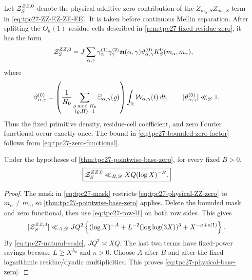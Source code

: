 Let \(\mathcal Z_S^{ZZ,0}\) denote the physical additive-zero contribution of
the \(Z_{m_\alpha,S}Z_{m_\gamma,S}\) term in
\eqref{eq:tpc27-ZZ-EZ-ZE-EE}.  It is taken before continuous Mellin
separation.  After splitting the \(O_h(1)\) residue cells described in
\cref{rem:tpc27-fixed-residue-zero}, it has the form
\begin{align}
 \mathcal Z_S^{ZZ,0}
 ={}&J\sum_{\alpha,\gamma}
 \gamma_\alpha^{(1)}\gamma_\gamma^{(2)}
 \mathfrak m(\alpha,\gamma)
 \vartheta_{\alpha,\gamma}^{(0)}
 K_S^0(m_\alpha,m_\gamma),
 \label{eq:tpc27-physical-ZZ-zero}
\end{align}
where
\begin{equation}
 \vartheta_{\alpha,\gamma}^{(0)}
 =\left(
 \frac1{H_0}
 \sum_{\substack{\varrho\bmod H_0\\(\varrho,H)=1}}
 \Xi_{\alpha,\gamma}(\varrho)
 \right)
 \int_{\mathbb R}\mathcal W_{\alpha,\gamma}(t)\,dt,
 \qquad
 |\vartheta_{\alpha,\gamma}^{(0)}|\ll_{\mathscr D}1.
 \label{eq:tpc27-bounded-zero-factor}
\end{equation}
Thus the fixed primitive density, residue-cell coefficient, and zero
Fourier functional occur exactly once.  The bound in
\eqref{eq:tpc27-bounded-zero-factor} follows from
\eqref{eq:tpc27-zero-functional}.

\begin{theorem}
\label{thm:tpc27-physical-base-zero}
Under the hypotheses of
\cref{thm:tpc27-pointwise-base-zero}, for every fixed \(B>0\),
\begin{equation}
 \boxed{
 \mathcal Z_S^{ZZ,0}
 \ll_{B,\mathscr D}XQ(\log X)^{-B}.}
 \label{eq:tpc27-physical-base-zero}
\end{equation}
\end{theorem}

\begin{proof}
The mask in \eqref{eq:tpc27-mask} restricts
\eqref{eq:tpc27-physical-ZZ-zero} to \(m_\alpha\ne m_\gamma\), so
\cref{thm:tpc27-pointwise-base-zero} applies.  Delete the bounded mask
and zero functional, then use \eqref{eq:tpc27-row-l1} on both row
sides.  This gives
\begin{align}
 |\mathcal Z_S^{ZZ,0}|
 \ll_{A,\mathscr D}
 JQ^2\left\{
 (\log X)^{-A}
 +L^{-2}(\log\log(3X))^3
 +X^{-\kappa+o(1)}
 \right\}.
 \label{eq:tpc27-physical-zero-prebound}
\end{align}
By \eqref{eq:tpc27-natural-scale}, \(JQ^2\asymp XQ\).  The last two
terms have fixed-power savings because
\(L\ge X^{\lambda_0}\) and \(\kappa>0\).  Choose \(A\) after \(B\)
and after the fixed logarithmic residue/dyadic multiplicities.  This
proves \eqref{eq:tpc27-physical-base-zero}.
\end{proof}

